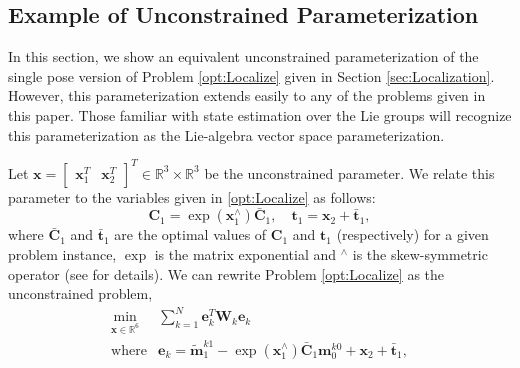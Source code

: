 \documentclass[lettersize,journal]{IEEEtran}
\begin{document}
{\subsection{Example of Unconstrained Parameterization}

In this section, we show an equivalent unconstrained parameterization of the single pose version of Problem \ref{opt:Localize} given in Section \ref{sec:Localization}. However, this parameterization extends easily to any of the problems given in this paper. Those familiar with state estimation over the Lie groups will recognize this parameterization as the Lie-algebra vector space parameterization. 

Let $\bm{x}= \begin{bmatrix} \bm{x}_1^T & \bm{x}_2^T\end{bmatrix}^T \in \mathbb{R}^3\times\mathbb{R}^3$ be the unconstrained parameter. We relate this parameter to the variables given in \ref{opt:Localize} as follows:
\begin{equation}
	\bm{C}_1 = \exp(\bm{x}_1^\wedge)\bar{\bm{C}}_1, \quad \bm{t}_1 = \bm{x}_2 + \bar{\bm{t}}_1,
\end{equation} 
where $\bar{\bm{C}}_1$ and $\bar{\bm{t}}_1$ are the optimal values of $\bm{C}_1$ and $\bm{t}_1$ (respectively) for a given problem instance, $\exp$ is the matrix exponential and $^\wedge$ is the skew-symmetric operator (see \cite{barfoot2011state} for details). We can rewrite Problem \ref{opt:Localize} as the unconstrained problem,
\begin{equation}
	\label{opt:LocalizeUnc}
	\begin{array}{rl}
		\min\limits_{\bm{x} \in \mathbb{R}^6} &\sum\limits_{k=1}^N \bm{e}_{k}^T \bm{W}_{k} \bm{e}_{k} \\
		\mbox{where} & \bm{e}_{k} = \tilde{\bm{m}}_1^{k1} - \exp(\bm{x}_1^\wedge)\bar{\bm{C}}_1\bm{m}_0^{k0} + \bm{x}_2 + \bar{\bm{t}}_1,
	\end{array}
\end{equation}

}
\end{document}
